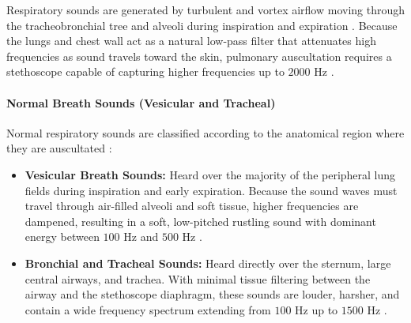 Respiratory sounds are generated by turbulent and vortex airflow moving through the tracheobronchial tree and alveoli during inspiration and expiration \cite{pasterkamp1997respiratory}. Because the lungs and chest wall act as a natural low-pass filter that attenuates high frequencies as sound travels toward the skin, pulmonary auscultation requires a stethoscope capable of capturing higher frequencies up to $2000\text{ Hz}$ \cite{pasterkamp1997respiratory, leng2015electronic}.

\paragraph{Normal Breath Sounds (Vesicular and Tracheal)}
Normal respiratory sounds are classified according to the anatomical region where they are auscultated \cite{pasterkamp1997respiratory}:
\begin{itemize}
    \item \textbf{Vesicular Breath Sounds:} Heard over the majority of the peripheral lung fields during inspiration and early expiration. Because the sound waves must travel through air-filled alveoli and soft tissue, higher frequencies are dampened, resulting in a soft, low-pitched rustling sound with dominant energy between $100\text{ Hz}$ and $500\text{ Hz}$ \cite{pasterkamp1997respiratory, leng2015electronic}.
    \item \textbf{Bronchial and Tracheal Sounds:} Heard directly over the sternum, large central airways, and trachea. With minimal tissue filtering between the airway and the stethoscope diaphragm, these sounds are louder, harsher, and contain a wide frequency spectrum extending from $100\text{ Hz}$ up to $1500\text{ Hz}$ \cite{pasterkamp1997respiratory}.
\end{itemize}

